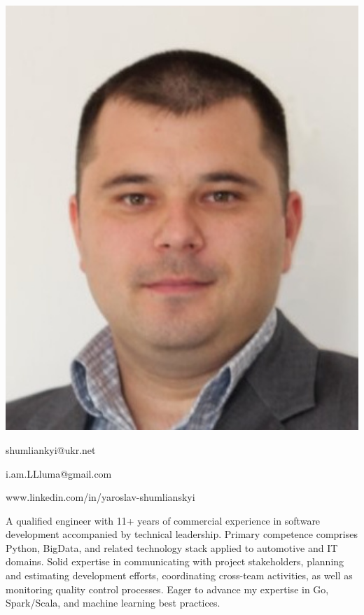 \documentclass[paper=a4,fontsize=11pt]{temp} %
\begin{document}
\begin{minipage}{.2\linewidth}
   \includegraphics[width=1\textwidth]{IMG/photo}
\end{minipage}
\begin{minipage}{0.7\linewidth}
   \sepspace
   \noindent

   \hfill shumliankyi@ukr.net

   \hfill i.am.LLluma@gmail.com

   \hfill www.linkedin.com/in/yaroslav-shumlianskyi


\end{minipage}


A qualified engineer with 11+ years of commercial experience in software development accompanied by technical
leadership.
Primary competence comprises Python, BigData, and related technology stack applied to automotive and IT domains.
Solid expertise in communicating with project stakeholders, planning and estimating development efforts, coordinating
cross-team activities, as well as monitoring quality control processes.
Eager to advance my expertise in Go, Spark/Scala, and machine learning best practices.
\end{document}
